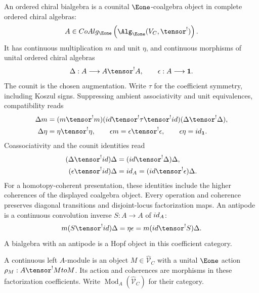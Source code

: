 \begin{definition}\label{def:vol4-ordered-chiral-bialgebra}
An ordered chiral bialgebra is a counital $\Eone$-coalgebra object
in complete ordered chiral algebras:
\[
 A\in\operatorname{CoAlg}_{\Eone}
 \left(\Alg_{\Eone}
 (\widehat{\mathcal V}_C,\widehat{\tensor}^{!})\right).
\]
It has continuous multiplication $m$ and unit $\eta$, and continuous
morphisms of unital ordered chiral algebras
\[
 \Delta:A\longrightarrow A\widehat{\tensor}^{!}A,
 \qquad \epsilon:A\longrightarrow\mathbf1.
\]
The counit is the chosen augmentation.
Write $\tau$ for the coefficient symmetry, including Koszul signs.
Suppressing ambient associativity and unit equivalences, compatibility reads
\[
\begin{aligned}
 \Delta m&=(m\widehat{\tensor}^{!}m)
  (\id\widehat{\tensor}^{!}\tau\widehat{\tensor}^{!}\id)
  (\Delta\widehat{\tensor}^{!}\Delta),\\
 \Delta\eta&=\eta\widehat{\tensor}^{!}\eta,
 \qquad \epsilon m=\epsilon\widehat{\tensor}^{!}\epsilon,
 \qquad \epsilon\eta=\id_{\mathbf1}.
\end{aligned}
\]
Coassociativity and the counit identities read
\[
\begin{aligned}
 (\Delta\widehat{\tensor}^{!}\id)\Delta
   &=(\id\widehat{\tensor}^{!}\Delta)\Delta,\\
 (\epsilon\widehat{\tensor}^{!}\id)\Delta
   &=\id_A=(\id\widehat{\tensor}^{!}\epsilon)\Delta.
\end{aligned}
\]
For a homotopy-coherent presentation, these identities include the
higher coherences of the displayed coalgebra object.
Every operation and coherence preserves diagonal transitions and
disjoint-locus factorization maps.
An antipode is a continuous convolution inverse $S:A\to A$ of $id_A$:
\[
 m(S\widehat{\tensor}^{!}\id)\Delta
 =\eta\epsilon
 =m(\id\widehat{\tensor}^{!}S)\Delta.
\]
A bialgebra with an antipode is a Hopf object in this coefficient category.
\end{definition}

A continuous left $A$-module is an object $M\in\widehat{\mathcal V}_C$
with a unital $\Eone$ action
$\rho_M:A\widehat{\tensor}^{!}M\to M$.
Its action and coherences are morphisms in these factorization coefficients.
Write $\operatorname{Mod}_A(\widehat{\mathcal V}_C)$ for their category.

